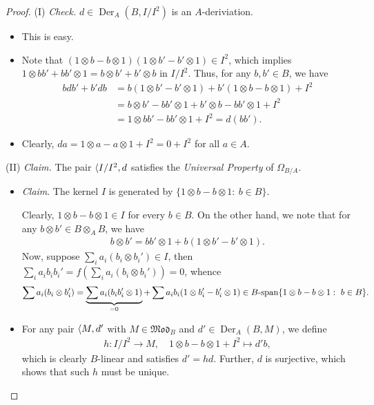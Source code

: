 \documentclass[11pt,a4paper,footinclude=true,headinclude=true]{scrbook} %
\DeclareMathOperator{\Der}{Der}
\newcommand{\<}{\langle}
\let\>\relax
\newcommand{\>}{\rangle}
\newcommand{\spn}{\mathchar`-\mathrm{span}}
\newcommand{\MOD}{\mathfrak{Mod}}
\begin{document}
\begin{proof}
    (I) \textit{Check.} $d\in\Der_A(B,I/I^2)$ is an $A$-deriviation.
    \begin{itemize}
        \item[(D1)] This is easy.
        \item[(D2)] Note that $(1\otimes b-b\otimes1)(1\otimes b'-b'\otimes1)\in I^2$, which implies $1\otimes bb'+bb'\otimes1=b\otimes b'+b'\otimes b$ in $I/I^2$. Thus, for any $b,b'\in B$, we have
        \begin{align*}
            bdb'+b'db &=b(1\otimes b'-b'\otimes1)+b'(1\otimes b-b\otimes1)+I^2\\ &=b\otimes b'-bb'\otimes1+b'\otimes b-bb'\otimes1+I^2\\ &=1\otimes bb'-bb'\otimes1+I^2=d(bb').
        \end{align*}
        \item[(D3)] Clearly, $da=1\otimes a-a\otimes1+I^2=0+I^2$ for all $a\in A$.
    \end{itemize}
    
    (II) \textit{Claim.} The pair $\<I/I^2,d\>$ satisfies the \textit{Universal Property} of $\Omega_{B/A}$.
    \begin{itemize}
        \item \textit{Claim}. The kernel $I$ is generated by $\{1\otimes b-b\otimes1:\ b\in B\}$.
        
        Clearly, $1\otimes b-b\otimes1\in I$ for every $b\in B$. On the other hand, we note that for any $b\otimes b'\in B\otimes_AB$, we have
        \begin{align*}
            b\otimes b'=bb'\otimes1+b(1\otimes b'-b'\otimes1).
        \end{align*}
        Now, suppose $\sum_ia_i(b_i\otimes b_i')\in I$, then $\sum_ia_ib_ib_i'=f(\sum_ia_i(b_i\otimes b_i'))=0$, whence
        \begin{align*}
            \sum a_i(b_i\otimes b_i')=\underbrace{\sum a_i(b_ib_i'\otimes1)}_{=0}+\sum a_ib_i(1\otimes b_i'-b_i'\otimes1)\in B\spn\{1\otimes b-b\otimes1:\ b\in B\}.
        \end{align*}
        \item For any pair $\<M,d'\>$ with $M\in\MOD_B$ and $d'\in\Der_A(B,M)$, we define
        \begin{align*}
            h:I/I^2\longrightarrow M,\quad1\otimes b-b\otimes1+I^2\longmapsto d'b,
        \end{align*}
        which is clearly $B$-linear and satisfies $d'=hd$. Further, $d$ is surjective, which shows that such $h$ must be unique.
    \end{itemize}
\end{proof}
\end{document}
